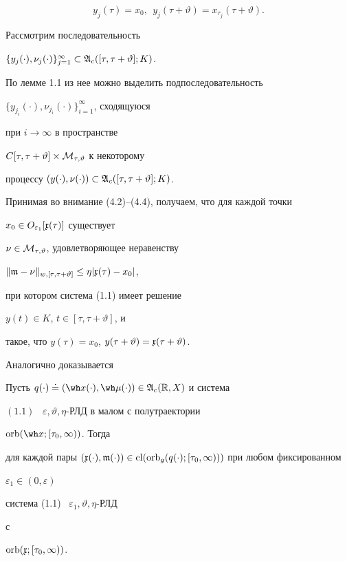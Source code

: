 \begin{pf}
\begin{equation}
y_{j}(\tau)=x_0,\ \ y_j(\tau+\vartheta)=x_{\tau_{j}}(\tau+\vartheta).


\end{equation}





Рассмотрим последовательность


$\{y_j(\cdot),\nu_j(\cdot)\}_{j=1}^{\infty}


\subset\frak A_c([\tau,\tau+\vartheta];K)$.


По лемме 1.1 из нее можно выделить подпоследовательность


$\{y_{j_i}(\cdot),\nu_{j_i}(\cdot)\}_{i=1}^{\infty}$, сходящуюся


при $i\to\infty$ в пространстве


$C[\tau,\tau+\vartheta]\times\cal M_{\tau,\vartheta}$ к некоторому


процессу $(y(\cdot),\nu(\cdot))\subset\frak A_c([\tau,\tau+\vartheta];K)$.


Принимая во внимание (4.2)--(4.4), получаем, что для каждой точки


$x_0\in O_{\varepsilon_1}[\frak x(\tau)]$ существует


$\nu\in\cal M_{\tau,\vartheta}$, удовлетворяющее неравенству


$\|\frak m-\nu\|_{w,[\tau,\tau+\vartheta]}


\le\eta|\frak x(\tau)-x_0|$,


при котором система (1.1) имеет решение


$y(t)\in K$, $t\in[\tau,\tau+\vartheta]$, и


такое, что $y(\tau)=x_0$, $y(\tau+\vartheta)={\frak x}(\tau+\vartheta)$.


\end{pf}





Аналогично доказывается








\begin{lems}


Пусть $q(\cdot)\doteq(\wh x(\cdot),\wh\mu(\cdot))


\in\frak A_c(\Bbb R,X)$ и система


$(1.1)$ \ $\varepsilon,\vartheta,\eta$-РЛД в малом с полутраектории


$\orb(\wh x;[\tau_0,\infty))$. Тогда


для каждой пары $(\frak x(\cdot),\frak m(\cdot))


\in\cl(\orb_g(q(\cdot);[\tau_0,\infty)))$ при любом фиксированном


$\varepsilon_1\in(0,\varepsilon)$


система (1.1) \ $\varepsilon_1,\vartheta,\eta$-РЛД


с


$\operatorname{orb}(\frak x;[\tau_0,\infty))$.


\end{lems}








